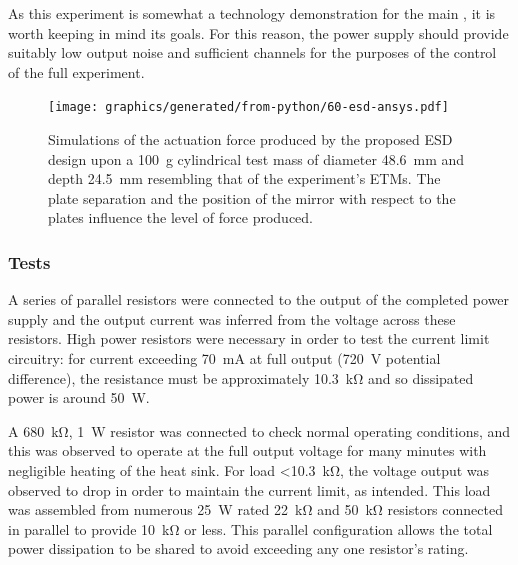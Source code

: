 As this experiment is somewhat a technology demonstration for the main \SSMEXPT{}, it is worth keeping in mind its goals. For this reason, the power supply should provide suitably low output noise and sufficient channels for the purposes of the control of the full experiment. 

\begin{figure}
  \centering
  \texttt{[image: graphics/generated/from-python/60-esd-ansys.pdf]}
  \caption{Simulations of the actuation force produced by the proposed \gls{ESD} design upon a \SI{100}{\gram} cylindrical test mass of diameter \SI{48.6}{\milli\meter} and depth \SI{24.5}{\milli\meter} resembling that of the \SSM experiment's ETMs. The plate separation and the position of the mirror with respect to the plates influence the level of force produced. }
  \label{fig:esd-ansys}
\end{figure}

\subsubsection{\label{sec:hv-psu-tests}Tests}

A series of parallel resistors were connected to the output of the completed power supply and the output current was inferred from the voltage across these resistors. High power resistors were necessary in order to test the current limit circuitry: for current exceeding \SI{70}{\milli\ampere} at full output (\SI{720}{\volt} potential difference), the resistance must be approximately \SI{10.3}{\kilo\ohm} and so dissipated power is around \SI{50}{\watt}.

A \SI{680}{\kilo\ohm}, \SI{1}{\watt} resistor was connected to check normal operating conditions, and this was observed to operate at the full output voltage for many minutes with negligible heating of the heat sink. For load \SI{<10.3}{\kilo\ohm}, the voltage output was observed to drop in order to maintain the current limit, as intended. This load was assembled from numerous \SI{25}{\watt} rated \SI{22}{\kilo\ohm} and \SI{50}{\kilo\ohm} resistors connected in parallel to provide \SI{10}{\kilo\ohm} or less. This parallel configuration allows the total power dissipation to be shared to avoid exceeding any one resistor's rating.

